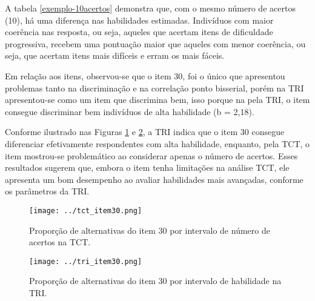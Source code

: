 A tabela \ref{exemplo-10acertos} demonstra que, com o mesmo número de acertos (10), há uma diferença nas habilidades estimadas. Indivíduos com maior coerência nas resposta, ou seja, aqueles que acertam itens de dificuldade progressiva, recebem uma pontuação maior que  aqueles com menor coerência, ou seja, que acertam itens mais difíceis e erram os mais fáceis.

Em relação aos itens, observou-se que o item 30, foi o único que apresentou problemas tanto na discriminação e na correlação ponto bisserial, porém na TRI apresentou-se como um item que discrimina bem, isso porque na pela TRI, o item consegue discriminar bem indivíduos de alta habilidade (b = 2,18).

Conforme ilustrado nas Figuras  \ref{fig:tct_item30} e \ref{fig:tri_item30}, a TRI indica que o item 30 consegue diferenciar efetivamente respondentes com alta habilidade, enquanto, pela TCT, o item mostrou-se problemático ao considerar apenas o número de acertos. Esses resultados sugerem que, embora o item tenha limitações na análise TCT, ele apresenta um bom desempenho ao avaliar habilidades mais avançadas, conforme os parâmetros da TRI. 

\begin{figure}[H]
	\centering
	\caption{Proporção de alternativas do item 30 por intervalo de número de acertos na TCT.}
	\texttt{[image: ../tct\_item30.png]}
	\parbox{\textwidth}{
		\centering %
	}
	\label{fig:tct_item30}
\end{figure}

\begin{figure}[H]
	\centering
	\caption{Proporção de alternativas do item 30 por intervalo de habilidade na TRI.}
	\texttt{[image: ../tri\_item30.png]}
	\parbox{\textwidth}{
		\centering %
	}
	\label{fig:tri_item30}
\end{figure}











